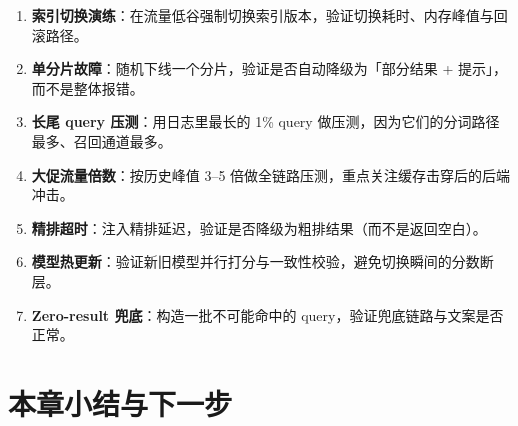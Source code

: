 \begin{toolbox}[搜索系统上线前的故障演练清单]
\begin{enumerate}
  \item \textbf{索引切换演练}：在流量低谷强制切换索引版本，验证切换耗时、内存峰值与回滚路径。
  \item \textbf{单分片故障}：随机下线一个分片，验证是否自动降级为「部分结果 + 提示」，而不是整体报错。
  \item \textbf{长尾 query 压测}：用日志里最长的 1\% query 做压测，因为它们的分词路径最多、召回通道最多。
  \item \textbf{大促流量倍数}：按历史峰值 3--5 倍做全链路压测，重点关注缓存击穿后的后端冲击。
  \item \textbf{精排超时}：注入精排延迟，验证是否降级为粗排结果（而不是返回空白）。
  \item \textbf{模型热更新}：验证新旧模型并行打分与一致性校验，避免切换瞬间的分数断层。
  \item \textbf{Zero-result 兜底}：构造一批不可能命中的 query，验证兜底链路与文案是否正常。
\end{enumerate}
\end{toolbox}

\section{本章小结与下一步}

